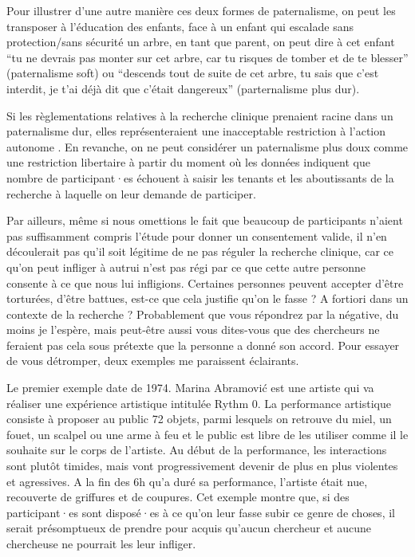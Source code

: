 \documentclass[
  12pt,
]{book}
\begin{document}
Pour illustrer d'une autre manière ces deux formes de paternalisme, on peut les transposer à l'éducation des enfants, face à un enfant qui escalade sans protection/sans sécurité un arbre, en tant que parent, on peut dire à cet enfant ``tu ne devrais pas monter sur cet arbre, car tu risques de tomber et de te blesser'' (paternalisme soft) ou ``descends tout de suite de cet arbre, tu sais que c'est interdit, je t'ai déjà dit que c'était dangereux'' (parternalisme plus dur).

Si les règlementations relatives à la recherche clinique prenaient racine dans un paternalisme dur, elles représenteraient une inacceptable restriction à l'action autonome \citep{sep-clinical-research}. En revanche, on ne peut considérer un paternalisme plus doux comme une restriction libertaire à partir du moment où les données indiquent que nombre de participant·es échouent à saisir les tenants et les aboutissants de la recherche à laquelle on leur demande de participer.

Par ailleurs, même si nous omettions le fait que beaucoup de participants n'aient pas suffisamment compris l'étude pour donner un consentement valide, il n'en découlerait pas qu'il soit légitime de ne pas réguler la recherche clinique, car ce qu'on peut infliger à autrui n'est pas régi par ce que cette autre personne consente à ce que nous lui infligions. Certaines personnes peuvent accepter d'être torturées, d'être battues, est-ce que cela justifie qu'on le fasse ? A fortiori dans un contexte de la recherche ? Probablement que vous répondrez par la négative, du moins je l'espère, mais peut-être aussi vous dites-vous que des chercheurs ne feraient pas cela sous prétexte que la personne a donné son accord. Pour essayer de vous détromper, deux exemples me paraissent éclairants.

Le premier exemple date de 1974. Marina Abramović est une artiste qui va réaliser une expérience artistique intitulée Rythm 0. La performance artistique consiste à proposer au public 72 objets, parmi lesquels on retrouve du miel, un fouet, un scalpel ou une arme à feu et le public est libre de les utiliser comme il le souhaite sur le corps de l'artiste. Au début de la performance, les interactions sont plutôt timides, mais vont progressivement devenir de plus en plus violentes et agressives. A la fin des 6h qu'a duré sa performance, l'artiste était nue, recouverte de griffures et de coupures. Cet exemple montre que, si des participant·es sont disposé·es à ce qu'on leur fasse subir ce genre de choses, il serait présomptueux de prendre pour acquis qu'aucun chercheur et aucune chercheuse ne pourrait les leur infliger.
\end{document}
